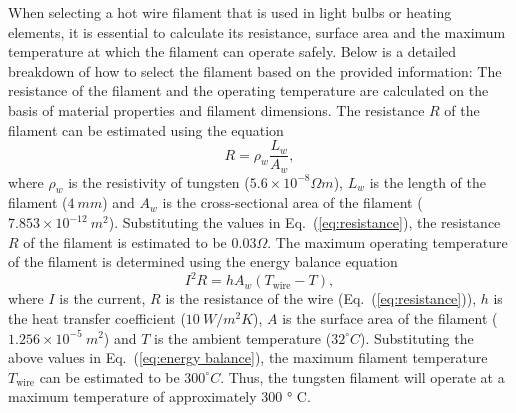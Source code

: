 When selecting a hot wire filament that is used in light bulbs or heating elements, it is essential to calculate its resistance, surface area and the maximum temperature at which the filament can operate safely. Below is a detailed breakdown of how to select the filament based on the provided information: The resistance of the filament and the operating temperature are calculated on the basis of material properties and filament dimensions. The resistance $R$ of the filament can be estimated using the equation
\begin{equation}\label{eq:resistance}
R = \rho_w \frac{L_w}{A_w},
\end{equation}
where $\rho_w$ is the resistivity of tungsten ($5.6 \times 10^{-8}\Omega m$), $L_w$ is the length of the filament ($4~mm$) and $A_w$ is the cross-sectional area of the filament ($7.853 \times 10^{-12}~m^2$). 
Substituting the values in Eq.~(\ref{eq:resistance}), the resistance $R$ of the filament is estimated to be $0.03\Omega$. The maximum operating temperature of the filament is determined using the energy balance equation
\begin{equation}\label{eq:energy balance}
I^2 R = h A_w (T_{\text{wire}} - T),    
\end{equation}
where $I$ is the current, $R$ is the resistance of the wire (Eq.~(\ref{eq:resistance})), $h$ is the heat transfer coefficient ($10~W/m^2K$), $A$ is the surface area of the filament ($1.256 \times 10^{-5}~m^2$) and $T$ is the ambient temperature ($32^\circ C$). Substituting the above values in Eq.~(\ref{eq:energy balance}), the maximum filament temperature $T_{\text{wire}}$ can be estimated to be $300^\circ C$. Thus, the tungsten filament will operate at a maximum temperature of approximately 300 ° C.



